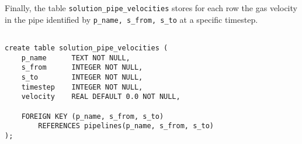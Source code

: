 Finally, the table \texttt{solution\_pipe\_velocities} stores for each row the gas velocity
in the pipe identified by \texttt{p\_name, s\_from, s\_to} at a specific timestep.
\begin{verbatim}

create table solution_pipe_velocities (
    p_name      TEXT NOT NULL,
    s_from      INTEGER NOT NULL,
    s_to        INTEGER NOT NULL,
    timestep    INTEGER NOT NULL,
    velocity    REAL DEFAULT 0.0 NOT NULL,

    FOREIGN KEY (p_name, s_from, s_to)
        REFERENCES pipelines(p_name, s_from, s_to)
);
\end{verbatim}


